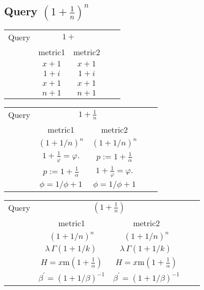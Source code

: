 \documentclass[12pt]{article} %
\begin{document}
\subsection{Query $(1+ \frac 1 n)^n$}

\begin{center}
\begin{tabular}{lcccc}
Query  & \multicolumn{2}{c}{ $1+$ } \\ & metric1 & metric2 \\
\hline
 &  $  x+1  $ & $    x+1               $ \\
 &  $  1+i   $ & $    1+i                               $ \\
 &  $  x+1   $ & $  x+1                             $ \\
 &  $  n+1  $ & $    n+1                             $ \\
\end{tabular}
\end{center}

\begin{center}
\begin{tabular}{lcccc}
Query  & \multicolumn{2}{c}{ $1+ \frac 1 n$ } \\ & metric1 & metric2 \\
\hline
 &  $ (1+1/n)^{n}   $ & $   (1+1/n)^{n}                          $ \\
 &  $  1+\frac{1}{\varphi}=\varphi.   $ & $ p:=1+\frac{1}{\alpha} $ \\
 &  $  p:=1+\frac{1}{\alpha}    $ & $  1+\frac{1}{\varphi}=\varphi.   $ \\
 &  $  \phi=1/\phi+1   $ & $ \phi=1/\phi+1                  $ \\
\end{tabular}
\end{center}

\begin{center}
\begin{tabular}{lcccc}
Query  & \multicolumn{2}{c}{ $(1+ \frac 1 n)$ } \\ & metric1 & metric2 \\
\hline
 &  $ (1+1/n)^{n}   $ & $  (1+1/n)^{n}                        $ \\
 &  $  \lambda\,\Gamma(1+1/k)\,  $ & $   \lambda\,\Gamma(1+1/k)\,                        $ \\
 &  $  H=x\text{m}\left(1+\frac{1}{\alpha}\right)    $ & $   H=x\text{m}\left(1+\frac{1}{\alpha}\right)        $ \\
 &  $  \beta^{\prime}=(1+1/\beta)^{-1}   $ & $  \beta^{\prime}=(1+1/\beta)^{-1}       $ \\
\end{tabular}
\end{center}
\end{document}
